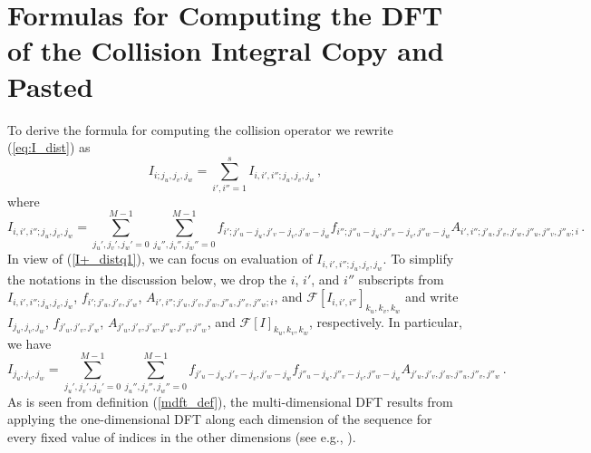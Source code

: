 \documentclass[12pt]{CSUNthesis}
\def\calF{\mathcal{F}}
\begin{document}
\section{Formulas for Computing the DFT of the Collision Integral Copy and Pasted}
To derive the formula for computing the collision operator we rewrite (\ref{eq:I_dist}) as
\begin{equation}
\label{I+_distq1}
I_{i;j_{u},j_{v},j_{w}}= \sum_{i',i''=1}^s I_{i,i',i'';j_{u},j_{v},j_{w}} \, ,
\end{equation}
where 
\begin{equation*}
I_{i,i',i'';j_{u},j_{v},j_{w}}=  \sum_{j_u',j_v',j_w'=0}^{M-1} \sum_{j_u'',j_v'',j_w''=0}^{M-1} f_{i';j'_{u}-j_{u},j'_{v}-j_{v},j'_{w}-j_{w}} f_{i'';j''_{u}-j_{u},j''_{v}-j_{v},j''_{w}-j_{w}} A_{i',i'';j'_{u},j'_{v},j'_{w},j''_u,j''_{v},j''_{w};i}\, .
\end{equation*}
In view of (\ref{I+_distq1}), we can focus on evaluation of $I_{i,i',i'';j_{u},j_{v},j_{w}}$. 
To simplify the notations in the discussion below, we drop the $i$, $i'$, and $i''$ subscripts from 
$I_{i,i',i'';j_{u},j_{v},j_{w}}$, $f_{i';j'_{u},j'_{v},j'_{w}}$, 
$A_{i',i'';j'_{u},j'_{v},j'_{w},j''_u,j''_{v},j''_{w};i}$, and  $\calF[I_{i,i',i''}]_{k_{u},k_{v},k_{w}}$ 
and write $I_{j_u,j_v,j_w}$, $f_{j'_{u},j'_{v},j'_{w}}$, 
$A_{j'_{u},j'_{v},j'_{w},j''_u,j''_{v},j''_{w}}$, and $\calF[I]_{k_{u},k_{v},k_{w}}$, respectively. 
In particular, we have
\begin{equation}
\label{I_all_index}
I_{j_u,j_v,j_w}=  \sum_{j_u',j_v',j_w'=0}^{M-1} \sum_{j_u'',j_v'',j_w''=0}^{M-1}f_{j'_{u}-j_{u},j'_{v}-j_{v},j'_{w}-j_{w}} f_{j''_{u}-j_{u},j''_{v}-j_{v},j''_{w}-j_{w}} A_{j'_{u},j'_{v},j'_{w},j''_u,j''_{v},j''_{w}}\, .
\end{equation}
As is seen from definition (\ref{mdft_def}), the multi-dimensional DFT results from applying the one-dimensional DFT along each dimension of the sequence for every fixed value of indices in the other dimensions (see e.g., \cite{Nussbaumer1982}).
\end{document}
